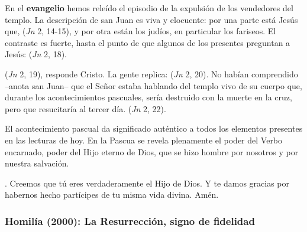 \begin{body}
En el \textbf{evangelio} hemos releído el episodio de la expulsión de los vendedores del templo. La descripción de san Juan es viva y elocuente: por una parte está Jesús que,  (\textit{Jn} 2, 14-15), y por otra están los judíos, en particular los fariseos. El contraste es fuerte, hasta el punto de que algunos de los presentes preguntan a Jesús:  (\textit{Jn} 2, 18).

 (\textit{Jn} 2, 19), responde Cristo. La gente replica:  (\textit{Jn} 2, 20). No habían comprendido –anota san Juan– que el Señor estaba hablando del templo vivo de su cuerpo que, durante los acontecimientos pascuales, sería destruido con la muerte en la cruz, pero que resucitaría al tercer día.  (\textit{Jn} 2, 22).

El acontecimiento pascual da significado auténtico a todos los elementos presentes en las lecturas de hoy. En la Pascua se revela plenamente el poder del Verbo encarnado, poder del Hijo eterno de Dios, que se hizo hombre por nosotros y por nuestra salvación.

. Creemos que tú eres verdaderamente el Hijo de Dios. Y te damos gracias por habernos hecho partícipes de tu misma vida divina. Amén.
\end{body}

\subsubsection{Homilía (2000): La Resurrección, signo de fidelidad}


